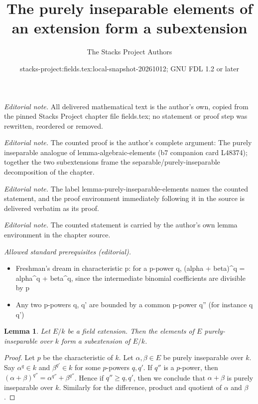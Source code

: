 \documentclass[10pt,a4paper]{amsart}
\title{The purely inseparable elements of an extension form a subextension}
\author{The Stacks Project Authors}
\date{stacks-project:fields.tex:local-snapshot-20261012; GNU FDL 1.2 or later}
\theoremstyle{plain}
\newtheorem{lemma}[subsection]{Lemma}
\theoremstyle{definition}
\theoremstyle{remark}
\numberwithin{equation}{subsection}
\begin{document}
\maketitle
\noindent\textit{Editorial note.} All delivered mathematical text is the author's own, copied from the pinned Stacks Project chapter file fields.tex; no statement or proof step was rewritten, reordered or removed.\par\medskip
\noindent\textit{Editorial note.} The counted proof is the author's complete argument: The purely inseparable analogue of lemma-algebraic-elements (b7 companion card L48374); together the two subextensions frame the separable/purely-inseparable decomposition of the chapter.\par\medskip
\noindent\textit{Editorial note.} The label lemma-purely-inseparable-elements names the counted statement, and the proof environment immediately following it in the source is delivered verbatim as its proof.\par\medskip
\noindent\textit{Editorial note.} The counted statement is carried by the author's own lemma environment in the chapter source.\par\medskip
\noindent\textit{Allowed standard prerequisites (editorial).}\begin{itemize}
\item Freshman's dream in characteristic p: for a p-power q, (alpha + beta)\textasciicircum{}q = alpha\textasciicircum{}q + beta\textasciicircum{}q, since the intermediate binomial coefficients are divisible by p
\item Any two p-powers q, q' are bounded by a common p-power q'' (for instance q q')
\end{itemize}\medskip
\begin{lemma}
\label{lemma-purely-inseparable-elements}
Let $E/k$ be a field extension. Then the elements of $E$ purely-inseparable
over $k$ form a subextension of $E/k$.
\end{lemma}

\begin{proof}
Let $p$ be the characteristic of $k$.
Let $\alpha, \beta \in E$ be purely inseparable over $k$. Say
$\alpha^q \in k$ and $\beta^{q'} \in k$ for some $p$-powers $q, q'$.
If $q''$ is a $p$-power, then
$(\alpha + \beta)^{q''} = \alpha^{q''} + \beta^{q''}$.
Hence if $q'' \geq q, q'$, then we conclude that $\alpha + \beta$
is purely inseparable over $k$. Similarly for the difference,
product and quotient of $\alpha$ and $\beta$.
\end{proof}
\end{document}
